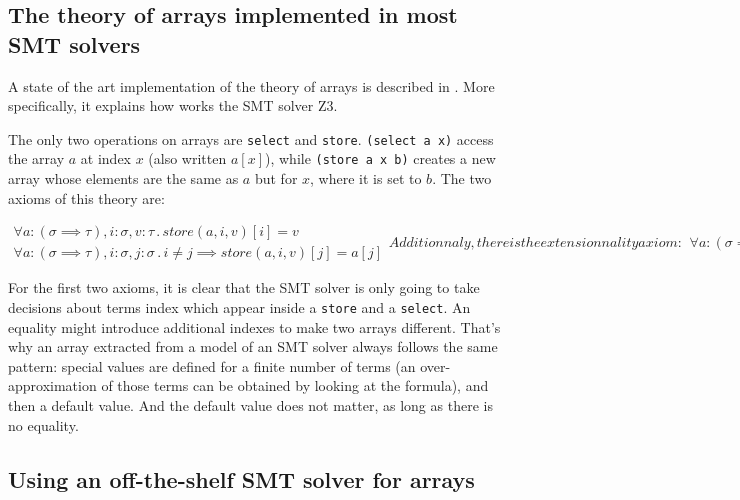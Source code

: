\documentclass[]{article}
\begin{document}
{\subsection{The theory of arrays implemented in most SMT
solvers}\label{the-theory-of-arrays-implemented-in-most-smt-solvers}

A state of the art implementation of the theory of arrays is described
in \cite{de2009generalized}. More specifically, it
explains how works the SMT solver Z3.

The only two operations on arrays are \texttt{select} and
\texttt{store}. \texttt{(select\ a\ x)} access the array $a$ at index
$x$ (also written $a[x]$), while \texttt{(store\ a\ x\ b)} creates a
new array whose elements are the same as $a$ but for $x$, where it
is set to $b$. The two axioms of this theory are:

\begin{subequations}
    \begin{align}
        \forall a:(\sigma \implies \tau), i:\sigma, v:\tau\, .\, store(a, i, v)[i] = v
        \\
        \forall a:(\sigma \implies \tau), i:\sigma, j:\sigma\, .\, i \neq j \implies store(a, i, v)[j] = a[j]
    \end{align}


    Additionnaly, there is the extensionnality axiom:

    \begin{align}
        \forall a:(\sigma \implies \tau), b:(\sigma \implies \tau)\, .\, a \neq b \iff \exists i\: a[i] \implies a[i] \neq b[i]
    \end{align}
\end{subequations}

For the first two axioms, it is clear that the SMT solver is only going
to take decisions about terms index which appear inside a \texttt{store}
and a \texttt{select}. An equality might introduce additional indexes to
make two arrays different. That's why an array extracted from a model of
an SMT solver always follows the same pattern: special values are
defined for a finite number of terms (an over-approximation of those
terms can be obtained by looking at the formula), and then a default
value. And the default value does not matter, as long as there is no
equality.

\subsection{Using an off-the-shelf SMT solver for
arrays}\label{using-an-off-the-shelf-smt-solver-for-arrays}

}
\end{document}

